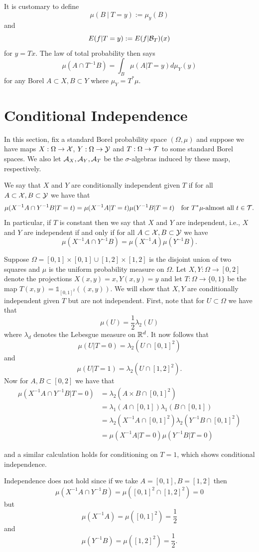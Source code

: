 \documentclass[twoside, a4paper, 10pt]{amsart}
\begin{document}
It is customary to define $$\mu(B ~|~ T = y) := \mu_y(B)$$ and $$E(f | T=y) := E(f|\mathcal{B}_T)(x)$$ for $y = Tx$. The law of total probability then says $$\mu(A \cap T^{-1}B) = \int_B \mu(A | T=y) d\mu_Y(y)  $$ for any Borel $A \subset X, B \subset Y$ where $\mu_Y = T^*\mu$.

\section{Conditional Independence}

In this section, fix a standard Borel probability space $(\Omega,\mu)$ and suppose we have maps $X:\Omega \to \mathcal{X}$, $Y:\Omega \to \mathcal{Y}$ and $T:\Omega \to \mathcal{T}$ to some standard Borel spaces. We also let $\mathcal{A}_X, \mathcal{A}_Y, \mathcal{A}_T$ be the $\sigma$-algebras induced by these masp, respectively.

\begin{mydef} We say that $X$ and $Y$ are conditionally independent given $T$ if for all $A  \subset \mathcal{X}, B  \subset \mathcal{Y}$ we have that $$\mu(X^{-1}A \cap Y^{-1}B |T=t) = \mu(X^{-1}A|T=t)\mu(Y^{-1}B|T=t) \quad\text{for $T^*\mu$-almost all } t \in \mathcal{T}.$$ In particular, if $T$ is constant then we say that $X$ and $Y$ are independent, i.e., $X$ and $Y$ are independent if and only if for all $A \subset \mathcal{X}, B \subset \mathcal{Y}$ we have $$\mu(X^{-1}A \cap Y^{-1}B) = \mu(X^{-1}A)\mu(Y^{-1}B).$$

\end{mydef}

\begin{eg} Suppose $\Omega = [0,1] \times [0,1] \cup [1,2] \times [1,2]$ is the disjoint union of two squares and $\mu$ is the uniform probability measure on $\Omega$. Let $X,Y:\Omega \to [0,2]$ denote the projections $X(x,y)=x, Y(x,y)=y$ and let $T:\Omega \to \{0,1\}$ be the map $T(x,y) = \mathds{1}_{[0,1]^2} ((x,y)).$ We will show that $X,Y$ are conditionally independent given $T$ but are not independent. First, note that for $U \subset \Omega$ we have that $$\mu(U) = \frac{1}{2}\lambda_2(U)$$ where $\lambda_d$ denotes the Lebesgue measure on $\mathbb{R}^d$. It now follows that $$\mu(U | T=0) = \lambda_2(U \cap [0,1]^2)$$ and $$\mu(U | T=1) = \lambda_2(U \cap [1, 2]^2).$$ Now for $A, B \subset [0,2]$ we have that 
\begin{align*} \mu(X^{-1}A \cap Y^{-1}B |T=0) &=\lambda_2(A \times B \cap [0,1]^2) \\ 
&= \lambda_1(A \cap [0,1]) \lambda_1(B \cap [0,1]) \\
&=  \lambda_2(X^{-1}A \cap [0,1]^2) \lambda_2(Y^{-1}B \cap [0,1]^2) \\
&= \mu(X^{-1}A | T=0) \mu(Y^{-1}B | T=0) \end{align*}

and a similar calculation holds for conditioning on $T=1$, which shows conditional independence.

Independence does not hold since if we take $A = [0,1], B = [1,2]$ then $$\mu(X^{-1}A \cap Y^{-1}B) = \mu([0,1]^2 \cap [1,2]^2) = 0$$ but $$\mu(X^{-1}A) = \mu([0,1]^2) = \frac{1}{2}$$ and $$\mu(Y^{-1}B) = \mu([1,2]^2) = \frac{1}{2}.$$

\end{eg}
\end{document}
